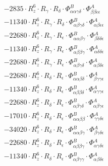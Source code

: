 \documentclass{article}
\begin{document}
\begin{subequations}
\begin{gather}
\begin{array}{c}
 \\[0.2em] 		 - 2835 \cdot R_{z}^{6} \cdot R_{\gamma{}} \cdot R_{\delta{}} \cdot \Phi{}^{B}_{\alpha{}\alpha{}\gamma{}\delta{}} \cdot \Phi{}^{A}_{\beta{}\beta{}\epsilon{}\epsilon{}} 
 \\[0.2em] 		 - 11340 \cdot R_{z}^{6} \cdot R_{\gamma{}} \cdot R_{\delta{}} \cdot \Phi{}^{B}_{\alpha{}\beta{}\gamma{}\delta{}} \cdot \Phi{}^{A}_{\alpha{}\beta{}\epsilon{}\epsilon{}} 
 \\[0.2em] 		 - 22680 \cdot R_{z}^{6} \cdot R_{\gamma{}} \cdot R_{\epsilon{}} \cdot \Phi{}^{B}_{\alpha{}\alpha{}\beta{}\gamma{}} \cdot \Phi{}^{A}_{\beta{}\delta{}\delta{}\epsilon{}} 
 \\[0.2em] 		 - 11340 \cdot R_{z}^{6} \cdot R_{\gamma{}} \cdot R_{\epsilon{}} \cdot \Phi{}^{B}_{\alpha{}\beta{}\beta{}\gamma{}} \cdot \Phi{}^{A}_{\alpha{}\delta{}\delta{}\epsilon{}} 
 \\[0.2em] 		 - 22680 \cdot R_{z}^{6} \cdot R_{\gamma{}} \cdot R_{\epsilon{}} \cdot \Phi{}^{B}_{\alpha{}\beta{}\gamma{}\delta{}} \cdot \Phi{}^{A}_{\alpha{}\beta{}\delta{}\epsilon{}} 
 \\[0.2em] 		 - 22680 \cdot R_{z}^{6} \cdot R_{\delta{}} \cdot R_{\epsilon{}} \cdot \Phi{}^{B}_{\alpha{}\alpha{}\beta{}\delta{}} \cdot \Phi{}^{A}_{\beta{}\gamma{}\gamma{}\epsilon{}} 
 \\[0.2em] 		 - 11340 \cdot R_{z}^{6} \cdot R_{\delta{}} \cdot R_{\epsilon{}} \cdot \Phi{}^{B}_{\alpha{}\beta{}\beta{}\delta{}} \cdot \Phi{}^{A}_{\alpha{}\gamma{}\gamma{}\epsilon{}} 
 \\[0.2em] 		 - 22680 \cdot R_{z}^{6} \cdot R_{\delta{}} \cdot R_{\epsilon{}} \cdot \Phi{}^{B}_{\alpha{}\beta{}\gamma{}\delta{}} \cdot \Phi{}^{A}_{\alpha{}\beta{}\gamma{}\epsilon{}} 
 \\[0.2em] 		 - 17010 \cdot R_{z}^{6} \cdot R_{\delta{}} \cdot R_{\epsilon{}} \cdot \Phi{}^{B}_{\alpha{}\alpha{}\beta{}\beta{}} \cdot \Phi{}^{A}_{\gamma{}\gamma{}\delta{}\epsilon{}} 
 \\[0.2em] 		 - 34020 \cdot R_{z}^{6} \cdot R_{\delta{}} \cdot R_{\epsilon{}} \cdot \Phi{}^{B}_{\alpha{}\alpha{}\beta{}\gamma{}} \cdot \Phi{}^{A}_{\beta{}\gamma{}\delta{}\epsilon{}} 
 \\[0.2em] 		 - 22680 \cdot R_{z}^{6} \cdot R_{\delta{}} \cdot R_{\epsilon{}} \cdot \Phi{}^{B}_{\alpha{}\beta{}\beta{}\gamma{}} \cdot \Phi{}^{A}_{\alpha{}\gamma{}\delta{}\epsilon{}} 
 \\[0.2em] 		 - 11340 \cdot R_{z}^{6} \cdot R_{\delta{}} \cdot R_{\epsilon{}} \cdot \Phi{}^{B}_{\alpha{}\beta{}\gamma{}\gamma{}} \cdot \Phi{}^{A}_{\alpha{}\beta{}\delta{}\epsilon{}} 

\end{array}
\end{gather}
\end{subequations}
\end{document}
